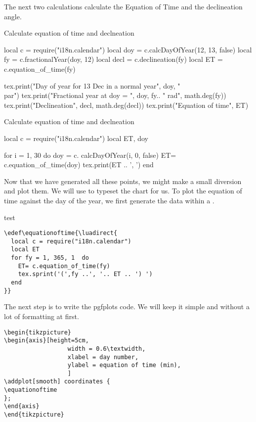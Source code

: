 The next two calculations calculate the Equation of Time and the declineation angle.

\begin{texexample}{Calculate equation of time and declneation}{}
\begin{luacode}
local c = require("i18n.calendar") 
local doy = c.calcDayOfYear(12, 13, false)
local fy = c.fractionalYear(doy, 12)
local decl = c.declineation(fy)
local ET   = c.equation_of_time(fy)

tex.print("Day of year for 13 Dec in a normal year", doy, "\\par")
tex.print("Fractional year at doy = ", doy, fy.. " rad", math.deg(fy))
tex.print("Declineation", decl, math.deg(decl))
tex.print("Equation of time", ET)
\end{luacode}
\end{texexample}

\begin{texexample}{Calculate equation of time and declneation}{}
\begin{luacode}
local c = require("i18n.calendar") 
local ET, doy   

for i = 1, 30 do 
    doy = c. calcDayOfYear(i, 0, false)
  ET= c.equation_of_time(doy)
  tex.print(ET .. ', ')
end 
\end{luacode}
\end{texexample}

Now that we have generated all these points, we might make a small diversion and plot them. We will use  to typeset the chart for us. To plot the equation of time against the day of the year, we first generate the data within a 
\cmd{\luadirect}. 
\bigskip

\begin{scriptexample}{test}{}
\begin{verbatim}
\edef\equationoftime{\luadirect{
  local c = require("i18n.calendar") 
  local ET   
  for fy = 1, 365, 1  do 
    ET= c.equation_of_time(fy)
    tex.sprint('(',fy ..', '.. ET .. ') ')
  end 
}}
\end{verbatim}
\end{scriptexample}
\bigskip

The next step is to write the pgfplots code. We will keep it simple and without a lot of formatting at first.
\edef\equationoftime{\luadirect{
local c = require("i18n.calendar") 
local ET   
for fy = 1, 365, 1  do 
  ET= c.equation_of_time(fy)
  tex.sprint('(',fy ..', '.. ET .. ') ')
end 
}}

\begin{scriptexample}{}{}
\begin{verbatim}
\begin{tikzpicture}
\begin{axis}[height=5cm,
                  width = 0.6\textwidth,
                  xlabel = day number,
                  ylabel = equation of time (min),
                  ]
\addplot[smooth] coordinates {
\equationoftime
};
\end{axis}
\end{tikzpicture}
\end{verbatim}
\end{scriptexample}

